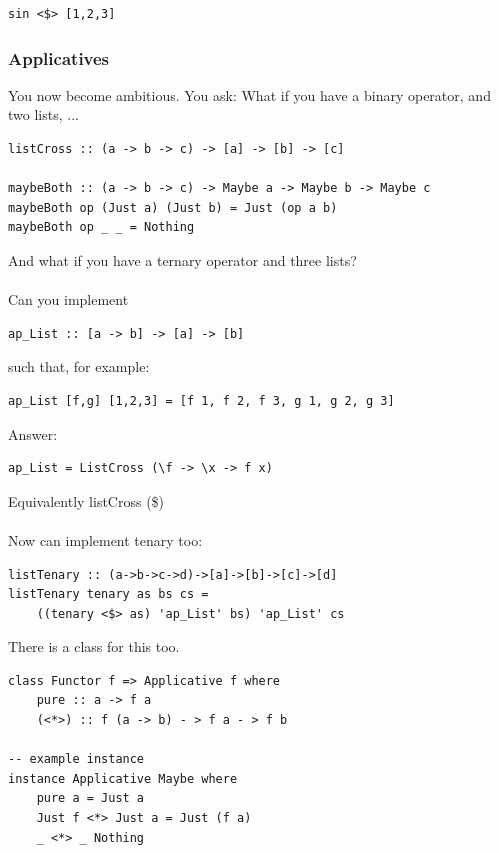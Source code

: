 \documentclass[12pt]{article}
\begin{document}
\begin{lstlisting}
sin <$> [1,2,3]
\end{lstlisting}

\subsubsection{Applicatives}

You now become ambitious. You ask: What if you have a binary operator, and two lists, ...

\begin{lstlisting}
listCross :: (a -> b -> c) -> [a] -> [b] -> [c]

maybeBoth :: (a -> b -> c) -> Maybe a -> Maybe b -> Maybe c
maybeBoth op (Just a) (Just b) = Just (op a b)
maybeBoth op _ _ = Nothing
\end{lstlisting}

And what if you have a ternary operator and three lists?\\
\\
Can you implement
\begin{lstlisting}
ap_List :: [a -> b] -> [a] -> [b]
\end{lstlisting}

such that, for example:

\begin{lstlisting}
ap_List [f,g] [1,2,3] = [f 1, f 2, f 3, g 1, g 2, g 3]
\end{lstlisting}

Answer:
\begin{lstlisting}
ap_List = ListCross (\f -> \x -> f x)
\end{lstlisting}
Equivalently listCross (\$)\\
\\
Now can implement tenary too:

\begin{lstlisting}
listTenary :: (a->b->c->d)->[a]->[b]->[c]->[d]
listTenary tenary as bs cs =
	((tenary <$> as) 'ap_List' bs) 'ap_List' cs
\end{lstlisting}

There is a class for this too.

\begin{lstlisting}
class Functor f => Applicative f where
	pure :: a -> f a
	(<*>) :: f (a -> b) - > f a - > f b

-- example instance
instance Applicative Maybe where
	pure a = Just a
	Just f <*> Just a = Just (f a)
	_ <*> _ Nothing
\end{lstlisting}
\end{document}
